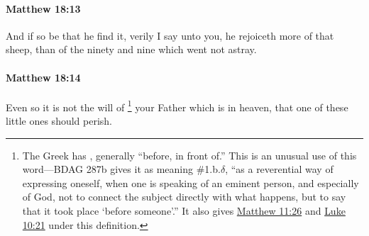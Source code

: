 		\paragraph{Matthew 18:13} %
			\label{MATTHEW-18-13}

			And if so be that he find it, verily I say unto you, he rejoiceth more of that sheep, than of the ninety and nine which went not astray.

			\begin{framed}
			\scriptsize
				\begin{compactdesc}
					\item[SBLG] 
				\end{compactdesc}
			\end{framed}

		\paragraph{Matthew 18:14} %
			\label{MATTHEW-18-14}

			Even so it is not the will of%
				\footnote{%
					The Greek has , generally ``before, in front of.'' This is an unusual use of this word---BDAG 287b gives it as meaning \#1.b.$\delta$, ``as a reverential way of expressing oneself, when one is speaking of an eminent person, and especially of God, not to connect the subject directly with what happens, but to say that it took place `before someone'.'' It also gives \hyperref[MATTHEW-11-26]{Matthew 11:26} and \hyperref[LUKE-10-21]{Luke 10:21} under this definition.
					} 
			your Father which is in heaven, that one of these little ones should perish.

